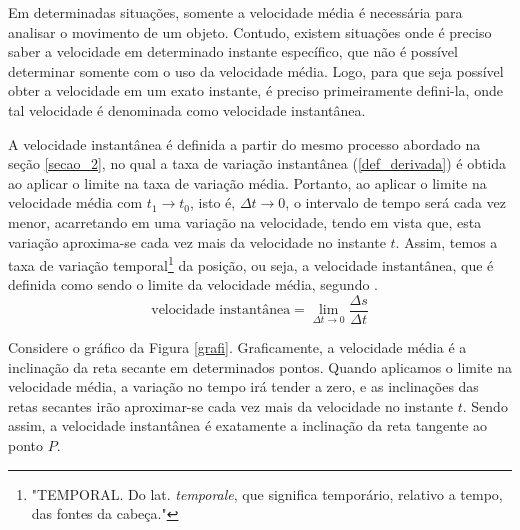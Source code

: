 \documentclass[
	12pt,				%
	openright,			%
    twoside,			%
	a4paper,			%
	chapter=TITLE,		%
	english,			%
	french,				%
	spanish,			%
	brazil				%
	]{abntex2}
\numberwithin{lema}{chapter}
\numberwithin{teorema}{chapter}
\numberwithin{definicao}{chapter}
\numberwithin{exemplo}{chapter}
\numberwithin{figure}{chapter}
\begin{document}
Em determinadas situações, somente a velocidade média é necessária para analisar o movimento de um objeto. Contudo, existem situações onde é preciso saber a velocidade em determinado instante específico, que não é possível determinar somente com o uso da velocidade média. Logo, para que seja possível obter a velocidade em um exato instante, é preciso primeiramente defini-la, onde tal velocidade é denominada como velocidade instantânea.  

A velocidade instantânea é definida a partir do mesmo processo abordado na seção \ref{secao_2}, no qual a taxa de variação instantânea (\ref{def_derivada}) é obtida ao aplicar o limite na taxa de variação média. Portanto, ao aplicar o limite na velocidade média com $t_1 \rightarrow t_0$, isto é, $\Delta t \rightarrow 0$, o intervalo de tempo será cada vez menor, acarretando em uma variação na velocidade, tendo em vista que, esta variação aproxima-se cada vez mais da velocidade no instante $t$. Assim, temos a taxa de variação temporal\footnote{"TEMPORAL. Do lat. \textit{temporale}, que significa temporário, relativo a tempo, das fontes da cabeça."\cite[p. 722]{dic}} da posição, ou seja, a velocidade instantânea, que é definida como sendo o limite da velocidade média, segundo .
\begin{equation}
	\text{velocidade instantânea} = \lim_{\Delta t\rightarrow 0} \dfrac{\Delta s}{\Delta t}
\end{equation}

Considere o gráfico da Figura \ref{grafi}. Graficamente, a velocidade média é a inclinação da reta secante em determinados pontos. Quando aplicamos o limite na velocidade média, a variação no tempo irá tender a zero, e as inclinações das retas secantes irão aproximar-se cada vez mais da velocidade no instante $t$. Sendo assim, a velocidade instantânea é exatamente a inclinação da reta tangente ao ponto $P$.
\end{document}
